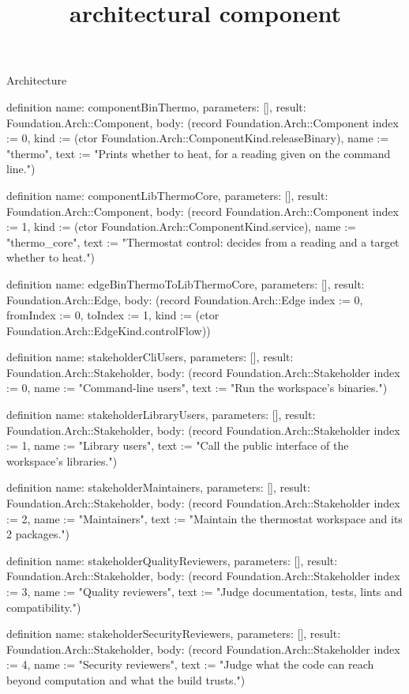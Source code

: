 \begin{lexlean}{Architecture}
\title{architectural component}
\begin{semanticmodule}
definition{
  name: componentBinThermo,
  parameters: [],
  result: Foundation.Arch::Component,
  body: (record Foundation.Arch::Component {index := 0, kind := (ctor Foundation.Arch::ComponentKind.releaseBinary), name := "thermo", text := "Prints whether to heat, for a reading given on the command line."})
}

definition{
  name: componentLibThermoCore,
  parameters: [],
  result: Foundation.Arch::Component,
  body: (record Foundation.Arch::Component {index := 1, kind := (ctor Foundation.Arch::ComponentKind.service), name := "thermo_core", text := "Thermostat control: decides from a reading and a target whether to heat."})
}

definition{
  name: edgeBinThermoToLibThermoCore,
  parameters: [],
  result: Foundation.Arch::Edge,
  body: (record Foundation.Arch::Edge {index := 0, fromIndex := 0, toIndex := 1, kind := (ctor Foundation.Arch::EdgeKind.controlFlow)})
}

definition{
  name: stakeholderCliUsers,
  parameters: [],
  result: Foundation.Arch::Stakeholder,
  body: (record Foundation.Arch::Stakeholder {index := 0, name := "Command-line users", text := "Run the workspace's binaries."})
}

definition{
  name: stakeholderLibraryUsers,
  parameters: [],
  result: Foundation.Arch::Stakeholder,
  body: (record Foundation.Arch::Stakeholder {index := 1, name := "Library users", text := "Call the public interface of the workspace's libraries."})
}

definition{
  name: stakeholderMaintainers,
  parameters: [],
  result: Foundation.Arch::Stakeholder,
  body: (record Foundation.Arch::Stakeholder {index := 2, name := "Maintainers", text := "Maintain the thermostat workspace and its 2 packages."})
}

definition{
  name: stakeholderQualityReviewers,
  parameters: [],
  result: Foundation.Arch::Stakeholder,
  body: (record Foundation.Arch::Stakeholder {index := 3, name := "Quality reviewers", text := "Judge documentation, tests, lints and compatibility."})
}

definition{
  name: stakeholderSecurityReviewers,
  parameters: [],
  result: Foundation.Arch::Stakeholder,
  body: (record Foundation.Arch::Stakeholder {index := 4, name := "Security reviewers", text := "Judge what the code can reach beyond computation and what the build trusts."})
}


\end{semanticmodule}
\end{lexlean}
